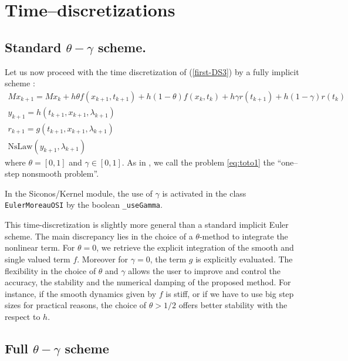 \section{Time--discretizations}



\subsection{Standard $\theta-\gamma$ scheme.}
Let us now proceed with the time discretization of (\ref{first-DS3}) by a fully implicit scheme :
\begin{equation}
  \begin{array}{l}
    \label{eq:toto1}
     M x_{k+1} = M x_{k} +h\theta f(x_{k+1},t_{k+1})+h(1-\theta) f(x_k,t_k) + h \gamma r(t_{k+1})
     + h(1-\gamma)r(t_k)  \\[2mm]
     y_{k+1} =  h(t_{k+1},x_{k+1},\lambda_{k+1}) \\[2mm]
     r_{k+1} =  g(t_{k+1},x_{k+1},\lambda_{k+1})\\[2mm]
     \mbox{NsLaw} ( y_{k+1} , \lambda_{k+1})
  \end{array}
\end{equation}
where $\theta = [0,1]$ and $\gamma \in [0,1]$. As in \cite{acary2008}, we call the problem \eqref{eq:toto1} the ``one--step nonsmooth problem''.

In the Siconos/Kernel module, the use of $\gamma$  is activated in the class {\tt EulerMoreauOSI} by the boolean {\tt \_useGamma}.



 This time-discretization is slightly more general than a standard implicit Euler scheme. The main discrepancy lies in the choice of a $\theta$-method to integrate the nonlinear term. For $\theta=0$, we retrieve the explicit integration of the smooth and  single valued term $f$. Moreover for $\gamma =0$, the term $g$ is explicitly evaluated. The flexibility in the choice of $\theta$ and $\gamma$ allows the user to improve and control the accuracy, the stability and the numerical damping of the proposed method. For instance, if the smooth dynamics given by $f$ is stiff, or if we have to use big step sizes for practical reasons, the choice of $\theta > 1/2$ offers better stability with the respect to $h$.

\subsection{Full $\theta-\gamma$ scheme}


